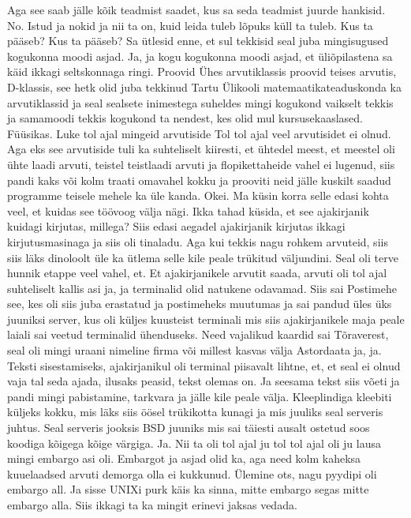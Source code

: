 Aga see saab jälle kõik teadmist saadet, kus sa seda teadmist juurde hankisid.
No.
Istud ja nokid ja nii ta on, kuid leida tuleb lõpuks küll ta tuleb. Kus ta pääseb?
Kus ta pääseb? Sa ütlesid enne, et sul tekkisid seal juba mingisugused kogukonna moodi asjad.
Ja, ja kogu kogukonna moodi asjad, et üliõpilastena sa käid ikkagi seltskonnaga ringi. Proovid Ühes arvutiklassis proovid teises arvutis, D-klassis, see hetk olid juba tekkinud Tartu Ülikooli matemaatikateaduskonda ka arvutiklassid ja seal sealsete inimestega suheldes mingi kogukond vaikselt tekkis ja samamoodi tekkis kogukond ta nendest, kes olid mul kursusekaaslased. Füüsikas.
Luke tol ajal mingeid arvutiside
Tol tol ajal veel arvutisidet ei olnud. Aga eks see arvutiside tuli ka suhteliselt kiiresti, et ühtedel meest, et meestel oli ühte laadi arvuti, teistel teistlaadi arvuti ja flopikettaheide vahel ei lugenud, siis pandi kaks või kolm traati omavahel kokku ja prooviti neid jälle kuskilt saadud programme teisele mehele ka üle kanda.
Okei.
Ma küsin korra selle edasi kohta veel, et kuidas see töövoog välja nägi. Ikka tahad küsida, et see ajakirjanik kuidagi kirjutas, millega?
Siis edasi aegadel ajakirjanik kirjutas ikkagi kirjutusmasinaga ja siis oli tinaladu. Aga kui tekkis nagu rohkem arvuteid, siis siis läks dinoloolt üle ka ütlema selle kile peale trükitud väljundini. Seal oli terve hunnik etappe veel vahel, et.
Et ajakirjanikele arvutit saada, arvuti oli tol ajal suhteliselt kallis asi ja, ja terminalid olid natukene odavamad. Siis sai Postimehe see, kes oli siis juba erastatud ja postimeheks muutumas ja sai pandud üles üks juuniksi server, kus oli küljes kuusteist terminali mis siis ajakirjanikele maja peale laiali sai veetud terminalid ühenduseks. Need vajalikud kaardid sai Tõraverest, seal oli mingi uraani nimeline firma või millest kasvas välja Astordaata ja, ja.
Teksti sisestamiseks, ajakirjanikul oli terminal piisavalt lihtne, et, et seal ei olnud vaja tal seda ajada, ilusaks peasid, tekst olemas on. Ja seesama tekst siis võeti ja pandi mingi pabistamine, tarkvara ja jälle kile peale välja. Kleeplindiga kleebiti küljeks kokku, mis läks siis öösel trükikotta kunagi ja mis juuliks seal serveris juhtus. Seal serveris jooksis BSD juuniks mis sai täiesti ausalt ostetud soos koodiga kõigega kõige värgiga. Ja.
Nii ta oli tol ajal ju tol tol ajal oli ju lausa mingi embargo asi oli.
Embargot ja asjad olid ka, aga need kolm kaheksa kuuelaadsed arvuti demorga olla ei kukkunud. Ülemine ots, nagu pyydipi oli embargo all.
Ja sisse UNIXi purk käis ka sinna, mitte embargo segas mitte embargo alla. Siis ikkagi ta ka mingit erinevi jaksas vedada.
